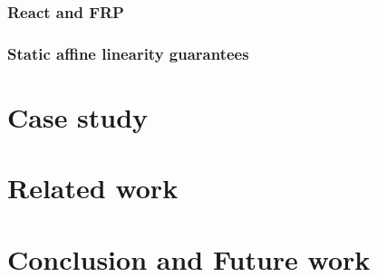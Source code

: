 \documentclass[submission,copyright,creativecommons]{eptcs}
\begin{document}
\subsubsection{React and FRP}

\subsubsection{Static affine linearity guarantees}

\section{Case study}


\section{Related work}





\section{Conclusion and Future work}
\end{document}
